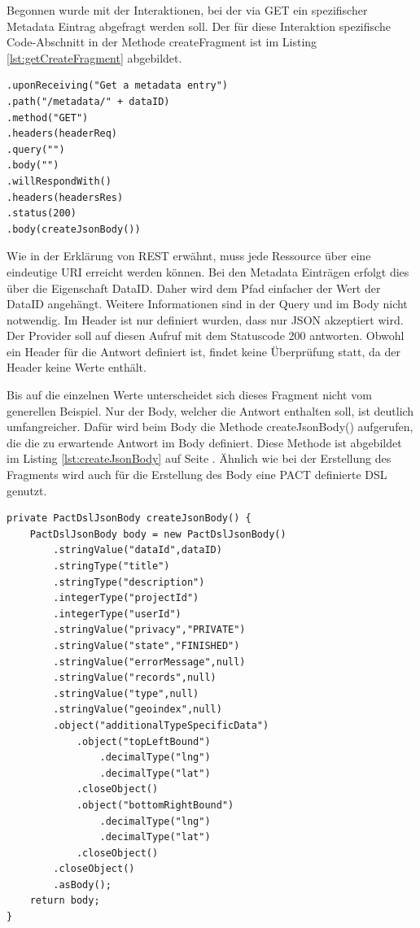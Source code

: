 \documentclass{llncs}
\begin{document}
Begonnen wurde mit der Interaktionen, bei der via GET ein spezifischer Metadata Eintrag abgefragt werden soll.
Der für diese Interaktion spezifische Code-Abschnitt in der Methode createFragment ist im Listing \ref{lst:getCreateFragment} abgebildet.

\lstset{language = Java}
\begin{lstlisting}[caption=createFragment für die GET-Methode,label=lst:getCreateFragment]
.uponReceiving("Get a metadata entry")
.path("/metadata/" + dataID)
.method("GET")
.headers(headerReq)
.query("")
.body("")
.willRespondWith()
.headers(headersRes)
.status(200)
.body(createJsonBody())
\end{lstlisting}

Wie in der Erklärung von REST erwähnt, muss jede Ressource über eine eindeutige URI erreicht werden können. Bei den Metadata Einträgen erfolgt dies über die Eigenschaft DataID. Daher wird dem Pfad einfacher der Wert der DataID angehängt. Weitere Informationen sind in der Query und im Body nicht notwendig. Im Header ist nur definiert wurden, dass nur JSON akzeptiert wird.
Der Provider soll auf diesen Aufruf mit dem Statuscode 200 antworten. Obwohl ein Header für die Antwort definiert ist, findet keine Überprüfung statt, da der Header keine Werte enthält. 

Bis auf die einzelnen Werte unterscheidet sich dieses Fragment nicht vom generellen Beispiel. Nur der Body, welcher die Antwort enthalten soll, ist deutlich umfangreicher. Dafür wird beim Body die Methode createJsonBody() aufgerufen, die die zu erwartende Antwort im Body definiert. Diese Methode ist abgebildet im Listing \ref{lst:createJsonBody} auf Seite \pageref{lst:createJsonBody}. Ähnlich wie bei der Erstellung des Fragments wird auch für die Erstellung des Body eine PACT definierte DSL genutzt.

\lstset{language = Java}
\begin{lstlisting}[caption=Erstellung eines JSON-Bodys,label={lst:createJsonBody}]
private PactDslJsonBody createJsonBody() {
    PactDslJsonBody body = new PactDslJsonBody()
        .stringValue("dataId",dataID)
        .stringType("title")
        .stringType("description")
        .integerType("projectId")
        .integerType("userId")
        .stringValue("privacy","PRIVATE")
        .stringValue("state","FINISHED")
        .stringValue("errorMessage",null)
        .stringValue("records",null)
        .stringValue("type",null)
        .stringValue("geoindex",null)
        .object("additionalTypeSpecificData")
            .object("topLeftBound")
                .decimalType("lng")
                .decimalType("lat")
            .closeObject()
            .object("bottomRightBound")
                .decimalType("lng")
                .decimalType("lat")
            .closeObject()
        .closeObject()
        .asBody();
    return body;
}
\end{lstlisting}
\end{document}
